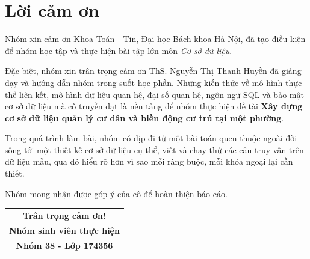 \section*{Lời cảm ơn}
\thispagestyle{empty}
\vspace{20pt}
\fontsize{14pt}{21pt}\selectfont

Nhóm xin cảm ơn Khoa Toán - Tin, Đại học Bách khoa Hà Nội, đã tạo điều kiện để nhóm học tập và thực hiện bài tập lớn môn \textit{Cơ sở dữ liệu}.

Đặc biệt, nhóm xin trân trọng cảm ơn ThS. Nguyễn Thị Thanh Huyền đã giảng dạy và hướng dẫn nhóm trong suốt học phần. Những kiến thức về mô hình thực thể liên kết, mô hình dữ liệu quan hệ, đại số quan hệ, ngôn ngữ SQL và bảo mật cơ sở dữ liệu mà cô truyền đạt là nền tảng để nhóm thực hiện đề tài \textbf{Xây dựng cơ sở dữ liệu quản lý cư dân và biến động cư trú tại một phường}.

Trong quá trình làm bài, nhóm có dịp đi từ một bài toán quen thuộc ngoài đời sống tới một thiết kế cơ sở dữ liệu cụ thể, viết và chạy thử các câu truy vấn trên dữ liệu mẫu, qua đó hiểu rõ hơn vì sao mỗi ràng buộc, mỗi khóa ngoại lại cần thiết.

Nhóm mong nhận được góp ý của cô để hoàn thiện báo cáo.

\vspace{15pt}
\begin{flushright}
\begin{tabular}{c}
    \textbf{Trân trọng cảm ơn!} \\
    \textbf{Nhóm sinh viên thực hiện}\\
    \textbf{Nhóm 38 - Lớp 174356}
\end{tabular}
\end{flushright}
